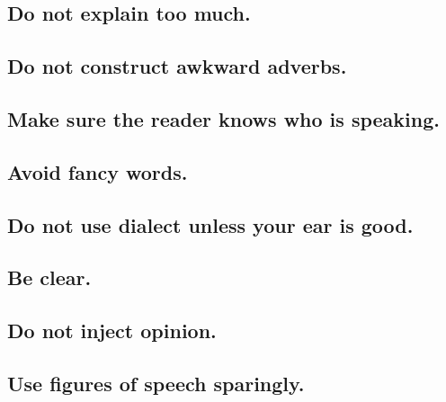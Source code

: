 \documentclass{article}
\numberwithin{equation}{section}
\begin{document}
\subsection{Do not explain too much.}


\subsection{Do not construct awkward adverbs.}


\subsection{Make sure the reader knows who is speaking.}


\subsection{Avoid fancy words.}


\subsection{Do not use dialect unless your ear is good.}


\subsection{Be clear.}


\subsection{Do not inject opinion.}


\subsection{Use figures of speech sparingly.}
\end{document}
